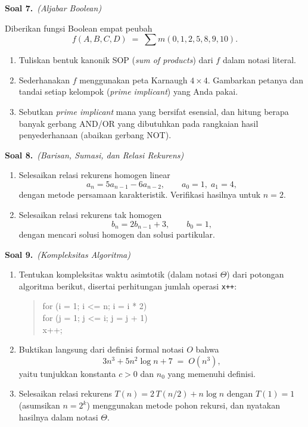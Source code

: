 \documentclass[11pt,a4paper]{article}
\newcommand{\soal}[2]{%
  \vspace{4pt}\noindent\textbf{Soal #1.}\ \textit{(#2)}\par\nobreak\vspace{2pt}}
\begin{document}
\soal{7}{Aljabar Boolean}
Diberikan fungsi Boolean empat peubah
\[
f(A,B,C,D) \;=\; \sum m(0,1,2,5,8,9,10).
\]
\begin{enumerate}[label=(\alph*),leftmargin=*]
  \item Tuliskan bentuk kanonik SOP (\emph{sum of products}) dari $f$ dalam notasi literal.
  \item Sederhanakan $f$ menggunakan peta Karnaugh $4\times4$.
        Gambarkan petanya dan tandai setiap kelompok (\emph{prime implicant})
        yang Anda pakai.
  \item Sebutkan \emph{prime implicant} mana yang bersifat esensial, dan hitung
        berapa banyak gerbang AND/OR yang dibutuhkan pada rangkaian hasil
        penyederhanaan (abaikan gerbang NOT).
\end{enumerate}

\soal{8}{Barisan, Sumasi, dan Relasi Rekurens}
\begin{enumerate}[label=(\alph*),leftmargin=*]
  \item Selesaikan relasi rekurens homogen linear
  \[
  a_n = 5a_{n-1} - 6a_{n-2}, \qquad a_0 = 1,\; a_1 = 4,
  \]
  dengan metode persamaan karakteristik. Verifikasi hasilnya untuk $n = 2$.
  \item Selesaikan relasi rekurens tak homogen
  \[
  b_n = 2b_{n-1} + 3, \qquad b_0 = 1,
  \]
  dengan mencari solusi homogen dan solusi partikular.
\end{enumerate}

\soal{9}{Kompleksitas Algoritma}
\begin{enumerate}[label=(\alph*),leftmargin=*]
  \item Tentukan kompleksitas waktu asimtotik (dalam notasi $\Theta$) dari potongan
  algoritma berikut, disertai perhitungan jumlah operasi \texttt{x++}:
  \begin{quote}
  \ttfamily
  for (i = 1; i <= n; i = i * 2)\\
  \hspace*{1.5em}for (j = 1; j <= i; j = j + 1)\\
  \hspace*{3em}x++;
  \end{quote}
  \item Buktikan langsung dari definisi formal notasi $O$ bahwa
  \[
  3n^{3} + 5n^{2}\log n + 7 \;=\; O(n^{3}),
  \]
  yaitu tunjukkan konstanta $c > 0$ dan $n_0$ yang memenuhi definisi.
  \item Selesaikan relasi rekurens $T(n) = 2\,T(n/2) + n\log n$ dengan $T(1) = 1$
  (asumsikan $n = 2^{k}$) menggunakan metode pohon rekursi, dan nyatakan hasilnya
  dalam notasi $\Theta$.
\end{enumerate}
\end{document}
